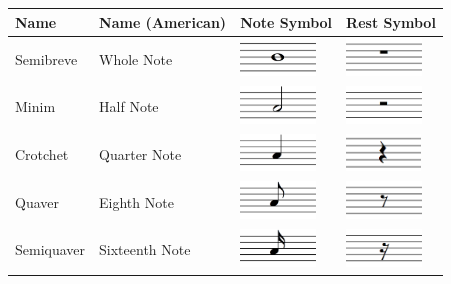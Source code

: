 \begin{table}[H]
    \renewcommand{\arraystretch}{1.8}
    \centering
    \begin{tabularx}{.7\textwidth}{ llll }
        \toprule

        Name & Name (American) & Note Symbol & Rest Symbol \\
        \midrule
        Semibreve & Whole Note      & \includegraphics[height=1cm]{gfx/music-theory/notehead-semibreve.png}  & \includegraphics[height=1cm]{gfx/music-theory/rest-semibreve.png} \\
        Minim & Half Note           & \includegraphics[height=1cm]{gfx/music-theory/notehead-minim.png}      & \includegraphics[height=1cm]{gfx/music-theory/rest-minim.png}     \\
        Crotchet & Quarter Note     & \includegraphics[height=1cm]{gfx/music-theory/notehead-crotchet.png}   & \includegraphics[height=1cm]{gfx/music-theory/rest-crotchet.png}  \\
        Quaver & Eighth Note        & \includegraphics[height=1cm]{gfx/music-theory/notehead-quaver.png}     & \includegraphics[height=1cm]{gfx/music-theory/rest-quaver.png}    \\
        Semiquaver & Sixteenth Note & \includegraphics[height=1cm]{gfx/music-theory/notehead-semiquaver.png} & \includegraphics[height=1cm]{gfx/music-theory/rest-semiquaver.png}\\

\end{tabularx}
\end{table}
